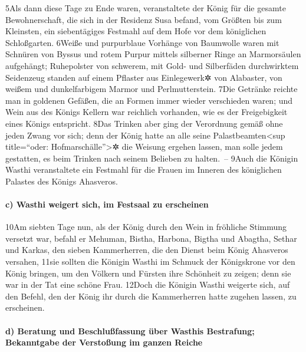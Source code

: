 5Als dann diese Tage zu Ende waren, veranstaltete der König für die
gesamte Bewohnerschaft, die sich in der Residenz Susa befand, vom
Größten bis zum Kleinsten, ein siebentägiges Festmahl auf dem Hofe vor
dem königlichen Schloßgarten. 6Weiße und purpurblaue Vorhänge von
Baumwolle waren mit Schnüren von Byssus und rotem Purpur mittels
silberner Ringe an Marmorsäulen aufgehängt; Ruhepolster von schwerem,
mit Gold- und Silberfäden durchwirktem Seidenzeug standen auf einem
Pflaster aus Einlegewerk✲ von Alabaster, von weißem und dunkelfarbigem
Marmor und Perlmutterstein. 7Die Getränke reichte man in goldenen
Gefäßen, die an Formen immer wieder verschieden waren; und Wein aus des
Königs Kellern war reichlich vorhanden, wie es der Freigebigkeit eines
Königs entspricht. 8Das Trinken aber ging der Verordnung gemäß ohne
jeden Zwang vor sich; denn der König hatte an alle seine
Palastbeamten\textless sup title=``oder: Hofmarschälle''\textgreater✲
die Weisung ergehen lassen, man solle jedem gestatten, es beim Trinken
nach seinem Belieben zu halten.~-- 9Auch die Königin Wasthi
veranstaltete ein Festmahl für die Frauen im Inneren des königlichen
Palastes des Königs Ahasveros.

\hypertarget{c-wasthi-weigert-sich-im-festsaal-zu-erscheinen}{%
\paragraph{c) Wasthi weigert sich, im Festsaal zu
erscheinen}\label{c-wasthi-weigert-sich-im-festsaal-zu-erscheinen}}

10Am siebten Tage nun, als der König durch den Wein in fröhliche
Stimmung versetzt war, befahl er Mehuman, Bistha, Harbona, Bigtha und
Abagtha, Sethar und Karkas, den sieben Kammerherren, die den Dienst beim
König Ahasveros versahen, 11sie sollten die Königin Wasthi im Schmuck
der Königskrone vor den König bringen, um den Völkern und Fürsten ihre
Schönheit zu zeigen; denn sie war in der Tat eine schöne Frau. 12Doch
die Königin Wasthi weigerte sich, auf den Befehl, den der König ihr
durch die Kammerherren hatte zugehen lassen, zu erscheinen.

\hypertarget{d-beratung-und-beschluuxdffassung-uxfcber-wasthis-bestrafung-bekanntgabe-der-verstouxdfung-im-ganzen-reiche}{%
\paragraph{d) Beratung und Beschlußfassung über Wasthis Bestrafung;
Bekanntgabe der Verstoßung im ganzen
Reiche}\label{d-beratung-und-beschluuxdffassung-uxfcber-wasthis-bestrafung-bekanntgabe-der-verstouxdfung-im-ganzen-reiche}}

